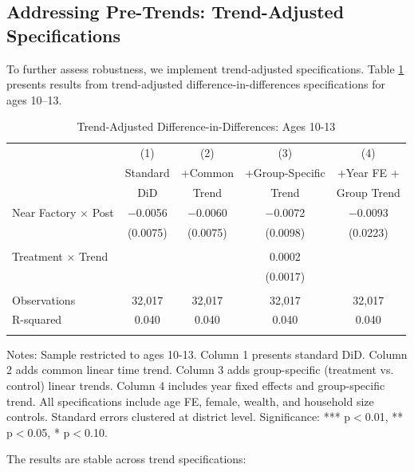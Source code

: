 \documentclass[12pt]{article}
\begin{document}
\subsection{Addressing Pre-Trends: Trend-Adjusted Specifications}

To further assess robustness, we implement trend-adjusted specifications. Table \ref{tab:trend_adjusted} presents results from trend-adjusted difference-in-differences specifications for ages 10--13.

\begin{table}[H]
\centering
\caption{Trend-Adjusted Difference-in-Differences: Ages 10-13}
\label{tab:trend_adjusted}
\begin{threeparttable}
\begin{tabular}{lcccc}
\toprule
& (1) & (2) & (3) & (4) \\
& Standard & +Common & +Group-Specific & +Year FE + \\
& DiD & Trend & Trend & Group Trend \\
\midrule
Near Factory $\times$ Post & $-$0.0056 & $-$0.0060 & $-$0.0072 & $-$0.0093 \\
& (0.0075) & (0.0075) & (0.0098) & (0.0223) \\
& & & & \\
Treatment $\times$ Trend & & & 0.0002 & \\
& & & (0.0017) & \\
\\
\midrule
Observations & 32,017 & 32,017 & 32,017 & 32,017 \\
R-squared & 0.040 & 0.040 & 0.040 & 0.040 \\
\\
\bottomrule
\end{tabular}
\begin{tablenotes}
\footnotesize
\item Notes: Sample restricted to ages 10-13. Column 1 presents standard DiD. Column 2 adds common linear time trend. Column 3 adds group-specific (treatment vs. control) linear trends. Column 4 includes year fixed effects and group-specific trend. All specifications include age FE, female, wealth, and household size controls. Standard errors clustered at district level. Significance: *** p$<$0.01, ** p$<$0.05, * p$<$0.10.
\end{tablenotes}
\end{threeparttable}
\end{table}

The results are stable across trend specifications:
\end{document}
